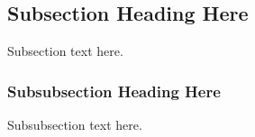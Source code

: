 \documentclass[conference]{IEEEtran}
\begin{document}
\subsection{Subsection Heading Here}
Subsection text here.


\subsubsection{Subsubsection Heading Here}
Subsubsection text here.


%
%



%
%
\end{document}
